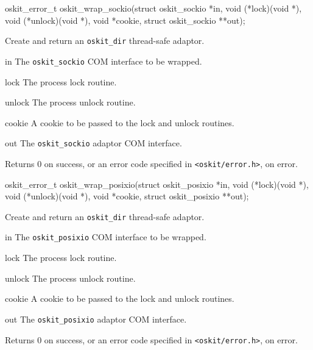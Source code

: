 \begin{apisyn}

	\funcproto oskit_error_t
	oskit_wrap_sockio(struct oskit_sockio *in, 
		void (*lock)(void *), 
		void (*unlock)(void *),
		void *cookie,
		struct oskit_sockio **out);
\end{apisyn}
\begin{apidesc}
	Create and return an {\tt oskit_dir} thread-safe adaptor.
\end{apidesc}
\begin{apiparm}
	\item[in]
		The {\tt oskit_sockio} COM interface to be wrapped.
	\item[lock]
		The process lock routine.
	\item[unlock]
		The process unlock routine.
	\item[cookie]
		A cookie to be passed to the lock and unlock routines.
	\item[out]
		The {\tt oskit_sockio} adaptor COM interface.
\end{apiparm}
\begin{apiret}
	Returns 0 on success, or an error code specified in
	{\tt <oskit/error.h>}, on error.
\end{apiret}


\begin{apisyn}

	\funcproto oskit_error_t
	oskit_wrap_posixio(struct oskit_posixio *in, 
		void (*lock)(void *), 
		void (*unlock)(void *),
		void *cookie,
		struct oskit_posixio **out);
\end{apisyn}
\begin{apidesc}
	Create and return an {\tt oskit_dir} thread-safe adaptor.
\end{apidesc}
\begin{apiparm}
	\item[in]
		The {\tt oskit_posixio} COM interface to be wrapped.
	\item[lock]
		The process lock routine.
	\item[unlock]
		The process unlock routine.
	\item[cookie]
		A cookie to be passed to the lock and unlock routines.
	\item[out]
		The {\tt oskit_posixio} adaptor COM interface.
\end{apiparm}
\begin{apiret}
	Returns 0 on success, or an error code specified in
	{\tt <oskit/error.h>}, on error.
\end{apiret}


